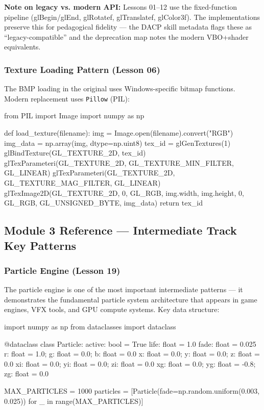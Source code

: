 \documentclass[11pt,letterpaper]{article}
\begin{document}
\textbf{Note on legacy vs. modern API:} Lessons 01--12 use the fixed-function pipeline (glBegin/glEnd, glRotatef, glTranslatef, glColor3f). The implementations preserve this for pedagogical fidelity --- the DACP skill metadata flags these as ``legacy-compatible'' and the deprecation map notes the modern VBO+shader equivalents.

\subsubsection{Texture Loading Pattern (Lesson 06)}

The BMP loading in the original uses Windows-specific bitmap functions. Modern replacement uses \texttt{Pillow} (PIL):

\begin{codebox}
from PIL import Image
import numpy as np

def load_texture(filename):
    img = Image.open(filename).convert("RGB")
    img_data = np.array(img, dtype=np.uint8)
    tex_id = glGenTextures(1)
    glBindTexture(GL_TEXTURE_2D, tex_id)
    glTexParameteri(GL_TEXTURE_2D, GL_TEXTURE_MIN_FILTER, GL_LINEAR)
    glTexParameteri(GL_TEXTURE_2D, GL_TEXTURE_MAG_FILTER, GL_LINEAR)
    glTexImage2D(GL_TEXTURE_2D, 0, GL_RGB, img.width, img.height,
                 0, GL_RGB, GL_UNSIGNED_BYTE, img_data)
    return tex_id
\end{codebox}

\subsection{Module 3 Reference --- Intermediate Track Key Patterns}

\subsubsection{Particle Engine (Lesson 19)}

The particle engine is one of the most important intermediate patterns --- it demonstrates the fundamental particle system architecture that appears in game engines, VFX tools, and GPU compute systems. Key data structure:

\begin{codebox}
import numpy as np
from dataclasses import dataclass

@dataclass
class Particle:
    active: bool = True
    life: float = 1.0
    fade: float = 0.025
    r: float = 1.0; g: float = 0.0; b: float = 0.0
    x: float = 0.0; y: float = 0.0; z: float = 0.0
    xi: float = 0.0; yi: float = 0.0; zi: float = 0.0
    xg: float = 0.0; yg: float = -0.8; zg: float = 0.0

MAX_PARTICLES = 1000
particles = [Particle(fade=np.random.uniform(0.003, 0.025))
             for _ in range(MAX_PARTICLES)]
\end{codebox}
\end{document}

